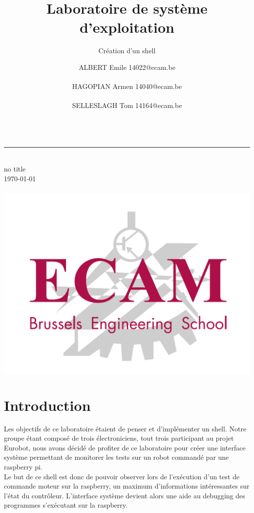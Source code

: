 \documentclass[10pt,a4paper]{article}
\title{Laboratoire de système d'exploitation}
\subtitle{Création d'un shell}
\author{
ALBERT Emile 14022@ecam.be\\\\
HAGOPIAN Armen 14040@ecam.be\\\\
SELLESLAGH Tom 14164@ecam.be\\\\
}
\makeatletter
\def\@subtitle{no title}
\makeatother
\begin{document}
\begin{titlepage} 
	\hspace{0.5cm}	
	\rule{1.5pt}{\textheight} 
	\hspace{1.5cm}		
	\parbox[b]{13cm}
	{  		
		{\huge \thetitle}\\[1\baselineskip]
		{\LARGE \@subtitle} \\[1\baselineskip]
		\today \\[3\baselineskip]
		
		{\Large \theauthor}\\[22\baselineskip]
		\hspace*{6cm}\includegraphics[scale=0.3]{Logo_ECAM.png}
	}
\end{titlepage}

\section{Introduction}
Les objectifs de ce laboratoire étaient de penser et d'implémenter un shell. Notre groupe étant composé de trois électroniciens, tout trois participant au projet Eurobot, nous avons décidé de profiter de ce laboratoire pour créer une interface système permettant de monitorer les tests sur un robot commandé par une raspberry pi.\\
  
Le but de ce shell est donc de pouvoir observer lors de l'exécution d'un test de commande moteur sur la raspberry, un maximum d'informations intéressantes sur l'état du contrôleur. L'interface système devient alors une aide au debugging des programmes s'exécutant sur la raspberry.
\end{document}
